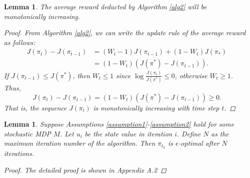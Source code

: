 \documentclass{article}
\theoremstyle{plain}
\newtheorem{lemma}[theorem]{Lemma}
\theoremstyle{definition}
\theoremstyle{remark}
\begin{document}
\begin{lemma}
\label{lemma0}
The average reward deducted by Algorithm \ref{alg2} will be monotonically increasing.
\begin{proof}
From Algorithm \ref{alg2}, we can write the update rule of the average reward as follows:
\begin{equation}
\begin{aligned}
J(\pi_{t}) - J(\pi_{t-1}) &= (W_{t}-1)J(\pi_{t-1}) + (1-W_{t})J(\pi_{*})\\
&= (1-W_{t})(J(\pi^{*})-J(\pi_{t-1})).
\end{aligned}
\end{equation}
If $J(\pi_{t-1}) \leq J(\pi^{*})$, then $W_{t}\leq 1$ since $\log\frac{J(\pi_{t})}{J(\pi^{*})} \leq 0$, otherwise $W_{t} \geq 1$. Thus, 
\begin{equation}
J(\pi_{t}) - J(\pi_{t-1}) = (1-W_{t})(J(\pi^{*})-J(\pi_{t-1})) \geq 0.
\end{equation}
That is, the sequence $J(\pi_{t})$ is monotonically increasing with time step $t$.
\end{proof}
\end{lemma}



\begin{lemma}
\label{lemma10}
Suppose Assumptions \ref{assumption1}-\ref{assumption2} hold for some stochastic MDP $M$. Let $u_{i}$ be the state value in iteration $i$. Define $N$ as the maximum iteration number of the algorithm. Then $\pi_{t_{k}}$ is $\epsilon$-optimal after $N$ iterations.
\begin{proof}
The detailed proof is shown in Appendix A.2
\end{proof}
\end{lemma}
\end{document}
